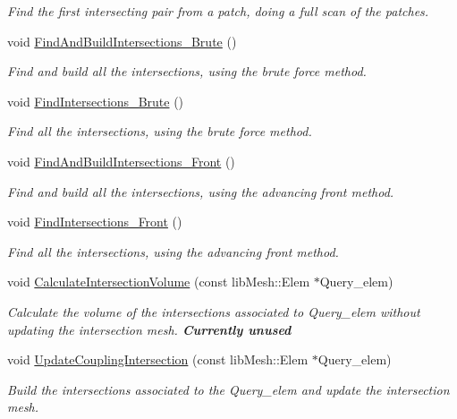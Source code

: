 \begin{DoxyCompactItemize}
\begin{DoxyCompactList}\small\item\em Find the first intersecting pair from a patch, doing a full scan of the patches. \end{DoxyCompactList}\item 
void \hyperlink{classcarl_1_1_intersection___search_a93a7dab3db1129a770d8a7b28322f9aa}{Find\+And\+Build\+Intersections\+\_\+\+Brute} ()
\begin{DoxyCompactList}\small\item\em Find and build all the intersections, using the brute force method. \end{DoxyCompactList}\item 
void \hyperlink{classcarl_1_1_intersection___search_af8aa21969e1f71ed50877aa6b6eb147d}{Find\+Intersections\+\_\+\+Brute} ()
\begin{DoxyCompactList}\small\item\em Find all the intersections, using the brute force method. \end{DoxyCompactList}\item 
void \hyperlink{classcarl_1_1_intersection___search_ad6fd579f71c4e9bebea6bc07d4de8dd5}{Find\+And\+Build\+Intersections\+\_\+\+Front} ()
\begin{DoxyCompactList}\small\item\em Find and build all the intersections, using the advancing front method. \end{DoxyCompactList}\item 
void \hyperlink{classcarl_1_1_intersection___search_a69d44884067e5bb1e63711c66c9c6d89}{Find\+Intersections\+\_\+\+Front} ()
\begin{DoxyCompactList}\small\item\em Find all the intersections, using the advancing front method. \end{DoxyCompactList}\item 
void \hyperlink{classcarl_1_1_intersection___search_a86eef059aabd920fbea11362abfc307f}{Calculate\+Intersection\+Volume} (const lib\+Mesh\+::\+Elem $\ast$Query\+\_\+elem)
\begin{DoxyCompactList}\small\item\em Calculate the volume of the intersections associated to Query\+\_\+elem without updating the intersection mesh. {\bfseries Currently unused} \end{DoxyCompactList}\item 
void \hyperlink{classcarl_1_1_intersection___search_a2a8731986e5f6963da7bada4c5eb9031}{Update\+Coupling\+Intersection} (const lib\+Mesh\+::\+Elem $\ast$Query\+\_\+elem)
\begin{DoxyCompactList}\small\item\em Build the intersections associated to the Query\+\_\+elem and update the intersection mesh. \end{DoxyCompactList}\end{DoxyCompactItemize}
